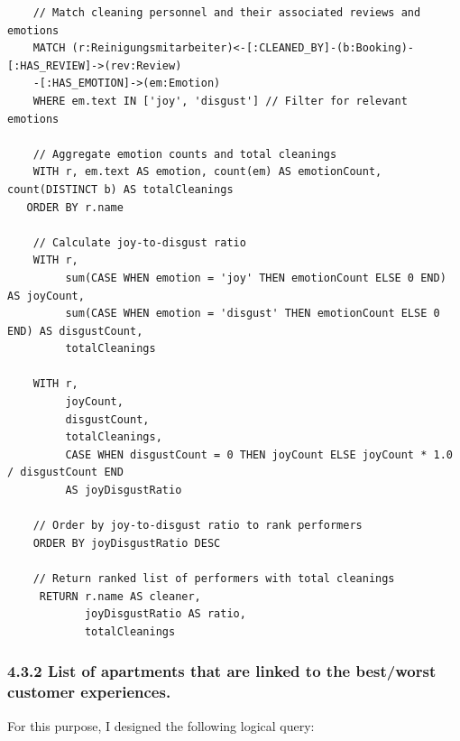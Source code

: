 \documentclass[
]{article}
\begin{document}
\begin{verbatim}
    // Match cleaning personnel and their associated reviews and emotions
    MATCH (r:Reinigungsmitarbeiter)<-[:CLEANED_BY]-(b:Booking)-[:HAS_REVIEW]->(rev:Review)
    -[:HAS_EMOTION]->(em:Emotion)
    WHERE em.text IN ['joy', 'disgust'] // Filter for relevant emotions

    // Aggregate emotion counts and total cleanings
    WITH r, em.text AS emotion, count(em) AS emotionCount, count(DISTINCT b) AS totalCleanings
   ORDER BY r.name

    // Calculate joy-to-disgust ratio
    WITH r, 
         sum(CASE WHEN emotion = 'joy' THEN emotionCount ELSE 0 END) AS joyCount,
         sum(CASE WHEN emotion = 'disgust' THEN emotionCount ELSE 0 END) AS disgustCount,
         totalCleanings

    WITH r, 
         joyCount, 
         disgustCount, 
         totalCleanings,
         CASE WHEN disgustCount = 0 THEN joyCount ELSE joyCount * 1.0 / disgustCount END 
         AS joyDisgustRatio

    // Order by joy-to-disgust ratio to rank performers
    ORDER BY joyDisgustRatio DESC

    // Return ranked list of performers with total cleanings
     RETURN r.name AS cleaner, 
            joyDisgustRatio AS ratio, 
            totalCleanings
\end{verbatim}

\subsubsection{4.3.2 List of apartments that are linked to the
best/worst customer
experiences.}\label{list-of-apartments-that-are-linked-to-the-bestworst-customer-experiences.}

For this purpose, I designed the following logical query:
\end{document}
